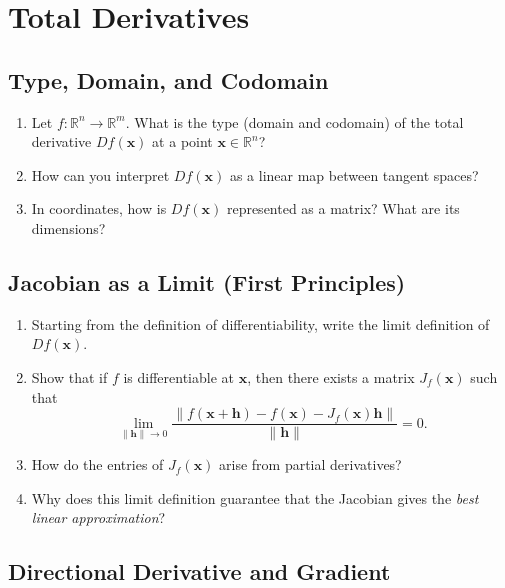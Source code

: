 \section{Total Derivatives}

\subsection{Type, Domain, and Codomain}

\begin{enumerate}
  \item Let \(f : \mathbb{R}^{n} \to \mathbb{R}^{m}\). What is the type (domain and codomain) of the total derivative \(Df(\mathbf{x})\) at a point \(\mathbf{x}\in \mathbb{R}^{n}\)?
  \item How can you interpret \(Df(\mathbf{x})\) as a linear map between tangent spaces?
  \item In coordinates, how is \(Df(\mathbf{x})\) represented as a matrix? What are its dimensions?
\end{enumerate}

\subsection{Jacobian as a Limit (First Principles)}

\begin{enumerate}[resume]
  \item Starting from the definition of differentiability, write the limit definition of \(Df(\mathbf{x})\).
  \item Show that if \(f\) is differentiable at \(\mathbf{x}\), then there exists a matrix \(J_{f}(\mathbf{x})\) such that
    \[ \lim_{\|\mathbf{h}\| \to 0}\frac{\|f(\mathbf{x}+\mathbf{h}) - f(\mathbf{x}) - J_{f}(\mathbf{x})\mathbf{h}\|}{\|\mathbf{h}\|}= 0. \]
  \item How do the entries of \(J_{f}(\mathbf{x})\) arise from partial derivatives?
  \item Why does this limit definition guarantee that the Jacobian gives the \emph{best linear approximation}?
\end{enumerate}

\subsection{Directional Derivative and Gradient}

